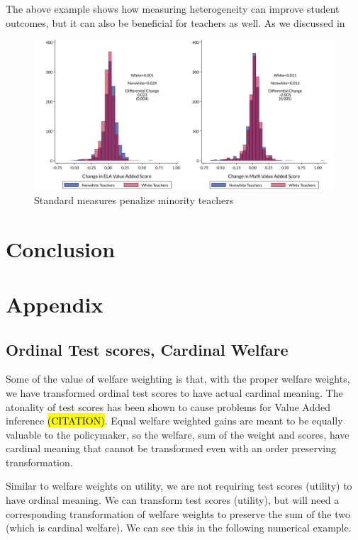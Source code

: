 \documentclass{article}
\theoremstyle{definition}
\theoremstyle{definition}
\theoremstyle{definition}
\theoremstyle{definition}
\begin{document}
The above example shows how measuring heterogeneity can improve student outcomes, but it can also be beneficial for teachers as well. As we discussed in 

\begin{figure}[H]
    \centering
    \includegraphics[width=.9\textwidth]{slides/slides_pffls/fig5_racial.pdf}
    \caption{Standard measures penalize minority teachers}
    \label{fig:my_label}
    
\end{figure}




\section{Conclusion} \label{conc} 


\section{Appendix}

   \subsection{Ordinal Test scores, Cardinal Welfare}
   \label{Cardinal_note}
    Some of the value of welfare weighting is that, with the proper welfare weights, we have transformed ordinal test scores to have actual cardinal meaning. The atonality of test scores has been shown to cause problems for Value Added inference \hl{(CITATION)}. Equal welfare weighted gains are meant to be equally valuable to the policymaker, so the welfare, sum of the weight and scores, have cardinal meaning that cannot be transformed even with an order preserving transformation. 
    
    Similar to welfare weights on utility, we are not requiring test scores (utility) to have ordinal meaning. We can transform test scores (utility), but will need a corresponding transformation of welfare weights to preserve the sum of the two (which is cardinal welfare). We can see this in the following numerical example. 
    
\end{document}
